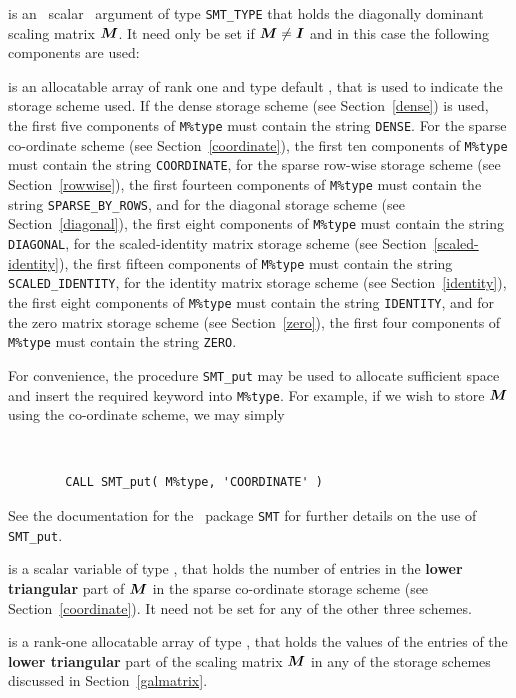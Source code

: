 \documentclass{galahad}
\begin{document}
\begin{description}
 is an \optional\ scalar \intentin\ argument of type {\tt SMT\_TYPE}
that holds the diagonally dominant scaling matrix ${\bm{M}}$. It need only be set
if ${\bm{M}} \neq {\bm{I}}$ and in this case the following components are used:

\begin{description}

 is an allocatable array of rank one and type default
\character, that
is used to indicate the storage scheme used. If the dense storage scheme
(see Section~\ref{dense}) is used,
the first five components of {\tt M\%type} must contain the
string {\tt DENSE}.
For the sparse co-ordinate scheme (see Section~\ref{coordinate}),
the first ten components of {\tt M\%type} must contain the
string {\tt COORDINATE},
for the sparse row-wise storage scheme (see Section~\ref{rowwise}),
the first fourteen components of {\tt M\%type} must contain the
string {\tt SPARSE\_BY\_ROWS},
and for the diagonal storage scheme (see Section~\ref{diagonal}),
the first eight components of {\tt M\%type} must contain the
string {\tt DIAGONAL},
for the scaled-identity matrix storage scheme
(see Section~\ref{scaled-identity}),
the first fifteen components of {\tt M\%type} must contain the
string {\tt SCALED\_IDENTITY},
for the identity matrix storage scheme
(see Section~\ref{identity}),
the first eight components of {\tt M\%type} must contain the
string {\tt IDENTITY}, and
for the zero matrix storage scheme
(see Section~\ref{zero}),
the first four components of {\tt M\%type} must contain the
string {\tt ZERO}.

For convenience, the procedure {\tt SMT\_put}
may be used to allocate sufficient space and insert the required keyword
into {\tt M\%type}.
For example, if we wish to store ${\bm{M}}$ using the co-ordinate scheme,
we may simply
{\tt
\begin{verbatim}
        CALL SMT_put( M%type, 'COORDINATE' )
\end{verbatim}
}
\noindent
See the documentation for the \galahad\ package {\tt SMT}
for further details on the use of {\tt SMT\_put}.

 is a scalar variable of type \integer, that
holds the number of entries in the {\bf lower triangular} part of ${\bm{M}}$
in the sparse co-ordinate storage scheme (see Section~\ref{coordinate}).
It need not be set for any of the other three schemes.

 is a rank-one allocatable array of type \realdp, that holds
the values of the entries of the {\bf lower triangular} part
of the scaling matrix ${\bm{M}}$ in any of the
storage schemes discussed in Section~\ref{galmatrix}.


\end{description}
\end{description}
\end{document}
